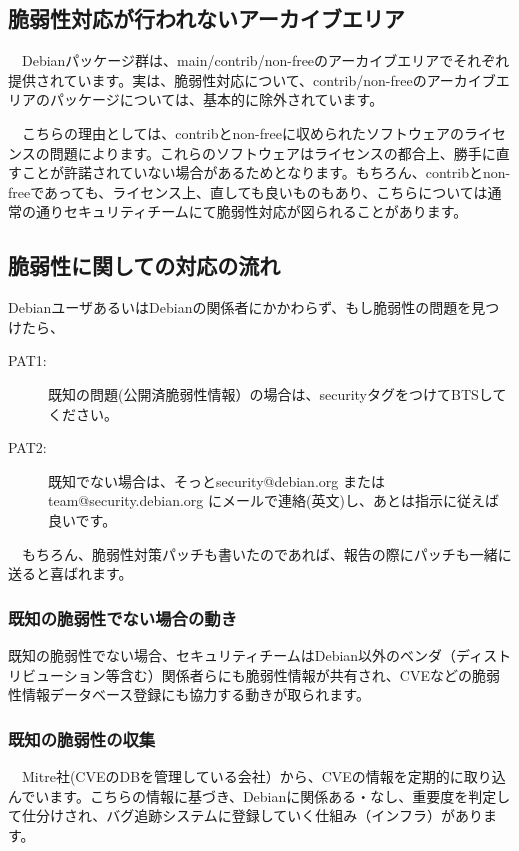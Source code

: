 \documentclass[mingoth,a4paper]{jsarticle}
\begin{document}
\subsection{脆弱性対応が行われないアーカイブエリア}

　Debianパッケージ群は、main/contrib/non-freeのアーカイブエリアでそれぞれ提供されています。実は、脆弱性対応について、contrib/non-freeのアーカイブエリアのパッケージについては、基本的に除外されています。

　こちらの理由としては、contribとnon-freeに収められたソフトウェアのライセンスの問題によります。これらのソフトウェアはライセンスの都合上、勝手に直すことが許諾されていない場合があるためとなります。もちろん、contribとnon-freeであっても、ライセンス上、直しても良いものもあり、こちらについては通常の通りセキュリティチームにて脆弱性対応が図られることがあります。

\subsection{脆弱性に関しての対応の流れ}

 DebianユーザあるいはDebianの関係者にかかわらず、もし脆弱性の問題を見つけたら、
\begin{description}
\item [PAT1:] 既知の問題(公開済脆弱性情報）の場合は、securityタグをつけてBTSしてください。
\item [PAT2:] 既知でない場合は、そっとsecurity@debian.org またはteam@security.debian.org にメールで連絡(英文)し、あとは指示に従えば良いです。
\end{description}

　もちろん、脆弱性対策パッチも書いたのであれば、報告の際にパッチも一緒に送ると喜ばれます。

\subsubsection{既知の脆弱性でない場合の動き}

 既知の脆弱性でない場合、セキュリティチームはDebian以外のベンダ（ディストリビューション等含む）関係者らにも脆弱性情報が共有され、CVEなどの脆弱性情報データベース登録にも協力する動きが取られます。

\subsubsection{既知の脆弱性の収集}

　Mitre社(CVEのDBを管理している会社）から、CVEの情報を定期的に取り込んでいます。こちらの情報に基づき、Debianに関係ある・なし、重要度を判定して仕分けされ、バグ追跡システムに登録していく仕組み（インフラ）があります。
\end{document}
